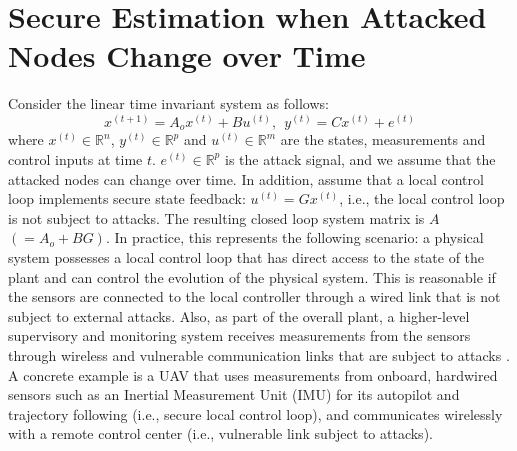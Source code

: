 \documentclass[../../thesis.tex]{subfiles}
\begin{document}
\section{Secure Estimation when Attacked Nodes Change over Time }  \label{sec:main}


Consider the linear time invariant system as follows:
\begin{equation}
x^{(t+1)} = A_o x^{(t)} + B u^{(t)}, ~~ y^{(t)} = C x ^{(t)} + e^{(t) }
\label{eq:system_model_se}
\end{equation} 
where $x^{(t)} \in \mathbb{R}^n$, $y^{(t)}  \in \mathbb{R}^p$ and $u^{(t)} \in \mathbb{R}^m$ are the states, measurements and control inputs at time $t$. $e^{(t)} \in \mathbb{R}^p$ is the attack signal, and we assume that the attacked nodes can change over time. 
In addition, assume that a local control loop implements secure state feedback: $u^{(t)} = Gx^{(t)}$, i.e., the local control loop is not subject to attacks. The resulting closed loop system matrix is $A$ $(=A_o+BG)$. 
In practice, this represents the following scenario: a physical system possesses a local control loop that has direct access to the state of the plant and can control the evolution of the physical system. This is reasonable if the sensors are connected to the local controller through a wired link that is not subject to external attacks. Also, as part of the overall plant, a higher-level supervisory and monitoring system receives measurements from the sensors through wireless and vulnerable communication links that are subject to attacks \cite{Fawzi:2014}. 
A concrete example is a UAV that uses measurements from onboard, hardwired sensors such as an Inertial Measurement Unit (IMU) for its autopilot and trajectory following (i.e., secure local control loop), and communicates wirelessly with a remote control center (i.e., vulnerable link subject to attacks).%
\end{document}
